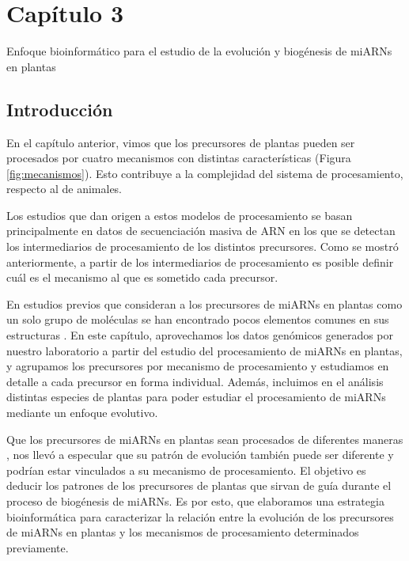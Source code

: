 
\graphicspath{{Chapter3/Figs/}}

\setcounter{chapter}{6}
\chapter*{Capítulo 3} 
\setcounter{figure}{0}
\setcounter{table}{0}
\setcounter{section}{0}

{\LARGE Enfoque bioinformático para el estudio de la evolución y biogénesis de miARNs en plantas}


\section{Introducción}

En el capítulo anterior, vimos que los precursores de plantas pueden ser procesados por cuatro mecanismos con distintas características (Figura \ref{fig:mecanismos}).
Esto contribuye a la complejidad del sistema de procesamiento, respecto al de animales.

Los estudios que dan origen a estos modelos de procesamiento se basan principalmente en datos de secuenciación masiva de ARN en los que se detectan los intermediarios de procesamiento de los distintos precursores.
Como se mostró anteriormente, a partir de los intermediarios de procesamiento es posible definir cuál es el mecanismo al que es sometido cada precursor.

En estudios previos que consideran a los precursores de miARNs en plantas como un solo grupo de moléculas se han encontrado pocos elementos comunes en sus estructuras \citep{Mateos2010}.
En este capítulo, aprovechamos los datos genómicos generados por nuestro laboratorio a partir del estudio del procesamiento de miARNs en plantas, y agrupamos los precursores por mecanismo de procesamiento y estudiamos en detalle a cada precursor en forma individual.
Además, incluimos en el análisis distintas especies de plantas para poder estudiar el procesamiento de miARNs mediante un enfoque evolutivo.

Que los precursores de miARNs en plantas sean procesados de diferentes maneras \citep{Bologna2013}, nos llevó a especular que su patrón de evolución también puede ser diferente y podrían estar vinculados a su mecanismo de procesamiento.
El objetivo es deducir los patrones de los precursores de plantas que sirvan de guía durante el proceso de biogénesis de miARNs.
Es por esto, que elaboramos una estrategia bioinformática para caracterizar la relación entre la evolución de los precursores de miARNs en plantas y los mecanismos de procesamiento determinados previamente.

